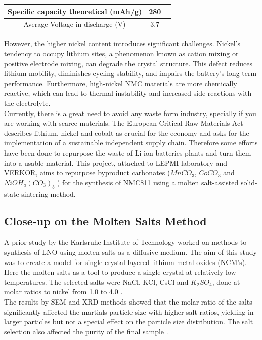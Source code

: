 \documentclass{article}
\begin{document}
{\begin{center}
  

\begin{tabular}{|c|c|c|}
  
  \hline
  Specific capacity
theoretical
(mAh/g) & 280  \\
  \hline
  Average Voltage in discharge (V) & 3.7  \\
  \hline
\end{tabular}
\end{center}

However, the higher nickel content introduces significant challenges. Nickel's tendency to occupy lithium sites, a phenomenon known as cation mixing or positive electrode mixing, can degrade the crystal structure. This defect reduces lithium mobility, diminishes cycling stability, and impairs the battery's long-term performance. Furthermore, high-nickel NMC materials are more chemically reactive, which can lead to thermal instability and increased side reactions with the electrolyte.\cite{NMCintro} \\

Currently, there is a great need to avoid any waste form industry,
specially if you are working with scarce materials. The European Critical Raw Materials Act describes lithium, nickel and cobalt as crucial for the economy and asks for the implementation of a sustainable independent supply chain.\cite{RMA} Therefore some efforts
have been done to repurpose the waste of Li-ion batteries plants and turn them into a usable material. This project, attached to LEPMI laboratory and VERKOR, aims to repurpose byproduct carbonates (\({MnCO}_{3}\), \({CoCO}_{3}\) and \({NiOH}_{a}{({CO}_{3})}_{b}\) ) for the synthesis of NMC811 using a molten salt-assisted solid-state sintering method. \\


\subsection{Close-up on the Molten Salts Method}
A prior study by the Karlsruhe Institute of Technology  worked on methods to 
synthesis of LNO using molten salts as a diffusive medium.
The aim of this study was to create a model for single crystal
layered lithium metal oxides (NCM's).\\
Here the molten salts as a tool to produce a single crystal
at relatively low temperatures.
The selected salts were NaCl, KCl, CsCl and \(K_{2}SO_{4}\), 
done at molar ratios to nickel from 1.0 to 4.0 \cite{meltingp}.\\
The results by SEM and XRD methods showed that the molar ratio
of the salts significantly affected the martials particle size with 
higher salt ratios, yielding in larger particles but not a special effect on the particle size distribution.
 The salt selection also affected the purity of the final sample \cite{meltingp}.

}
\end{document}
